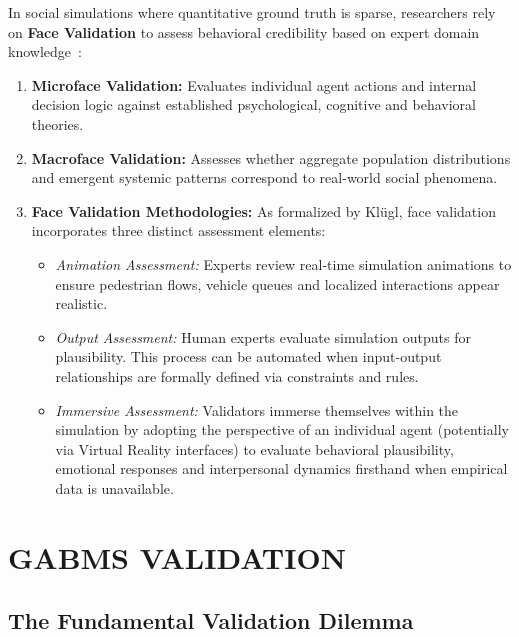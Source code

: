 \documentclass[12pt,a4paper]{report}
\begin{document}
In social simulations where quantitative ground truth is sparse, researchers rely on \textbf{Face Validation} to assess behavioral credibility based on expert domain knowledge~\cite{adornetto2025generative}:
\begin{enumerate}[label=\arabic*.]
    \item \textbf{Microface Validation:} Evaluates individual agent actions and internal decision logic against established psychological, cognitive and behavioral theories.
    \item \textbf{Macroface Validation:} Assesses whether aggregate population distributions and emergent systemic patterns correspond to real-world social phenomena.
    \item \textbf{Face Validation Methodologies:} As formalized by Kl{\"u}gl, face validation incorporates three distinct assessment elements:
    \begin{itemize}
        \item \textit{Animation Assessment:} Experts review real-time simulation animations to ensure pedestrian flows, vehicle queues and localized interactions appear realistic.
        \item \textit{Output Assessment:} Human experts evaluate simulation outputs for plausibility. This process can be automated when input-output relationships are formally defined via constraints and rules.
        \item \textit{Immersive Assessment:} Validators immerse themselves within the simulation by adopting the perspective of an individual agent (potentially via Virtual Reality interfaces) to evaluate behavioral plausibility, emotional responses and interpersonal dynamics firsthand when empirical data is unavailable.
    \end{itemize}
\end{enumerate}

\chapter{GABMS VALIDATION}
\label{chap:gabms_validation}

\section{The Fundamental Validation Dilemma}
\label{sec:black_box_dilemma}
\end{document}
